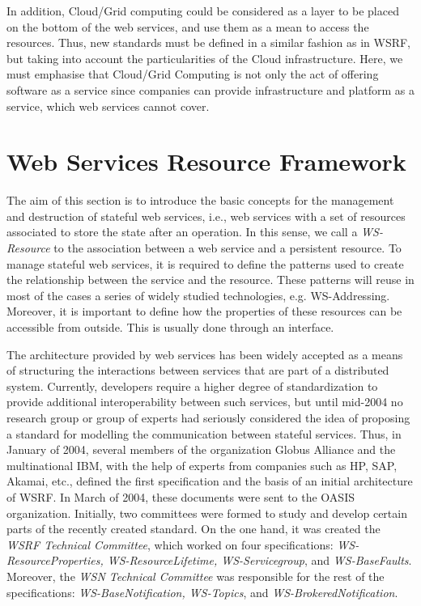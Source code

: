 In addition, Cloud/Grid computing could be considered as a layer to be placed on the bottom of the web services, 
and use them as a mean to access the resources. Thus, new standards must be defined in a similar fashion as in
WSRF, but taking into account the particularities of the Cloud infrastructure. Here, we must emphasise that Cloud/Grid 
Computing is not only the act of offering software as a service since companies can provide infrastructure and platform as a service, 
which web services cannot cover. 

\section{Web Services Resource Framework}

The aim of this section is to introduce the basic concepts for the management 
and destruction of stateful web services, i.e., web services with 
a set of resources associated to store the
state after an operation. In this sense, we call a \emph{WS-Resource} 
to the association between a web service and a persistent resource.
To manage stateful web services, it is required to 
define the patterns used to create the relationship between the service and the resource. These patterns
will reuse in most of the cases a series of widely studied technologies, e.g. WS-Addressing. 
Moreover, it is important to define how the properties of these resources can be accessible 
from outside. This is usually done through an interface.

The architecture provided by web services has been widely accepted as a means of 
structuring the interactions between services that are part of a distributed system. 
Currently, developers require a higher 
degree of standardization to provide additional interoperability between such services, 
but until mid-2004 no research group or group of experts had seriously considered the idea of 
proposing a standard for modelling the communication between stateful services.
Thus, in January of 2004, several members of the organization Globus Alliance and the multinational IBM, with 
the help of experts from companies such as HP, SAP, Akamai, etc., defined
the first specification and the basis of an initial architecture of WSRF. 
In March of 2004, these documents were sent to the OASIS organization. Initially, two committees were formed to study and develop 
certain parts of the recently created standard. 
On the one hand, it was created the \emph{WSRF Technical Committee}, which worked on four specifications:
\emph{WS-ResourceProperties, WS-ResourceLifetime, WS-Servicegroup}, 
and \emph{WS-BaseFaults}. Moreover, the \emph{WSN Technical Committee} 
was responsible for the rest of the specifications: \emph{WS-BaseNotification, WS-Topics}, and \emph{WS-BrokeredNotification}.

